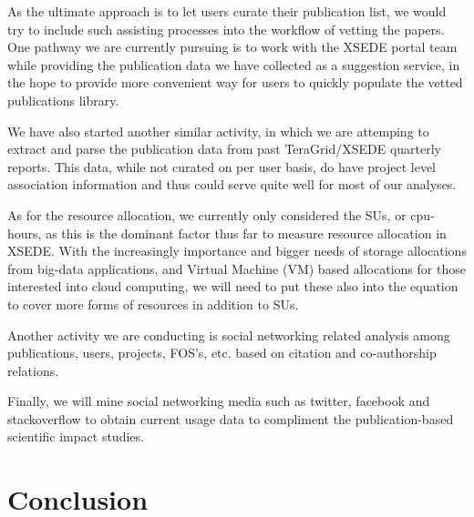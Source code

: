 \documentclass{sig-alternate}
\begin{document}
As the ultimate approach is to let users curate their publication list, we would try to include such assisting processes into the workflow of vetting the papers. One pathway we are currently pursuing is to work with the XSEDE portal team while providing the publication data we have collected as a suggestion service, in the hope to provide more convenient way for users to quickly populate the vetted publications library. 
 
We have also started another similar activity, in which we are attemping to  extract and parse the publication data from past TeraGrid/XSEDE quarterly reports. This data, while not curated on per user basis, do have project level association information and thus could serve quite well for most of our analyses. 

As for the resource allocation, we currently only considered the SUs, or cpu-hours, as this is the dominant factor thus far to measure resource allocation in XSEDE. With the increasingly importance and bigger needs of storage allocations from big-data applications, and Virtual Machine (VM) based allocations for those interested into cloud computing, we will need to put these also into the equation to cover more forms of resources in addition to SUs.

Another activity we are conducting is social networking related analysis among publications, users, projects, FOS's, etc. based on citation and co-authorship relations.

Finally, we will mine social networking media such as twitter, facebook and stackoverflow to obtain current usage data to compliment the publication-based scientific impact studies.

\section{Conclusion} \label{S:conclusion}
\end{document}
